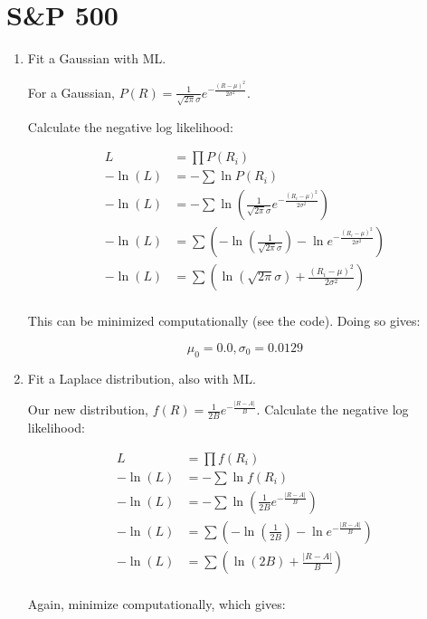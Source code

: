 \section{S\&P 500}

\begin{enumerate}[label=\textbf{\Alph*}.]
    \item Fit a Gaussian with ML.

    For a Gaussian, $P(R) = \frac{1}{\sqrt{2\pi}\sigma} e^{-\frac{(R-\mu)^2}{2\sigma^2}}$.

    Calculate the negative log likelihood:

    \begin{align*}
        L &= \prod P(R_i) \\
        -\ln(L) &= -\sum \ln P(R_i) \\
        -\ln(L) &= -\sum \ln\left(\frac{1}{\sqrt{2\pi}\sigma} e^{-\frac{(R_i-\mu)^2}{2\sigma^2}}\right) \\
        -\ln(L) &= \sum\left( -\ln \left(\frac{1}{\sqrt{2\pi}\sigma}\right) - \ln e^{-\frac{(R_i-\mu)^2}{2\sigma^2}}\right) \\
        -\ln(L) &= \sum\left(\ln \left(\sqrt{2\pi}\sigma\right) + \frac{(R_i-\mu)^2}{2\sigma^2}\right) \\
    \end{align*}

    This can be minimized computationally (see the code). Doing so gives:

    $$\mu_0=0.0, \sigma_0=0.0129$$

    \item Fit a Laplace distribution, also with ML.

    Our new distribution, $f(R) = \frac{1}{2B} e^{-\frac{|R-A|}{B}}$.
    Calculate the negative log likelihood:

    \begin{align*}
        L &= \prod f(R_i) \\
        -\ln(L) &= -\sum \ln f(R_i) \\
        -\ln(L) &= -\sum \ln\left(\frac{1}{2B} e^{-\frac{|R-A|}{B}}\right) \\
        -\ln(L) &= \sum\left(- \ln\left(\frac{1}{2B}\right) - \ln e^{-\frac{|R-A|}{B}}\right) \\
        -\ln(L) &= \sum\left(\ln\left(2B\right) + \frac{|R-A|}{B}\right) \\
    \end{align*}

    Again, minimize computationally, which gives:


\end{enumerate}
